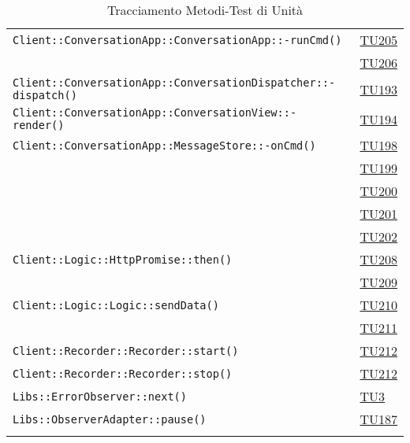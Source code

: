 \begin{longtable}{|>{\centering}m{12cm}|m{1cm}<{\centering}|}
\texttt{Client::ConversationApp::ConversationApp::-\linebreak runCmd()} & \hyperlink{TU205}{TU205}\\ & \hyperlink{TU206}{TU206}\\ \hline
\texttt{Client::ConversationApp::ConversationDispatcher::-\linebreak dispatch()} & \hyperlink{TU193}{TU193}\\ \hline
\texttt{Client::ConversationApp::ConversationView::-\linebreak render()} & \hyperlink{TU194}{TU194}\\ \hline
\texttt{Client::ConversationApp::MessageStore::-\linebreak onCmd()} & \hyperlink{TU198}{TU198}\\ & \hyperlink{TU199}{TU199}\\ & \hyperlink{TU200}{TU200}\\ & \hyperlink{TU201}{TU201}\\ & \hyperlink{TU202}{TU202}\\ \hline
\texttt{Client::Logic::HttpPromise::then()} & \hyperlink{TU208}{TU208}\\ & \hyperlink{TU209}{TU209}\\ \hline
\texttt{Client::Logic::Logic::sendData()} & \hyperlink{TU210}{TU210}\\ & \hyperlink{TU211}{TU211}\\ \hline
\texttt{Client::Recorder::Recorder::start()} & \hyperlink{TU212}{TU212}\\ \hline
\texttt{Client::Recorder::Recorder::stop()} & \hyperlink{TU212}{TU212}\\ \hline
\texttt{Libs::ErrorObserver::next()} & \hyperlink{TU3}{TU3}\\ \hline
\texttt{Libs::ObserverAdapter::pause()} & \hyperlink{TU187}{TU187}\\ \hline

\caption[Tracciamento Metodi-Test di Unità]{Tracciamento Metodi-Test di Unità}
\label{tabella:met-tu}
\end{longtable}
\clearpage
